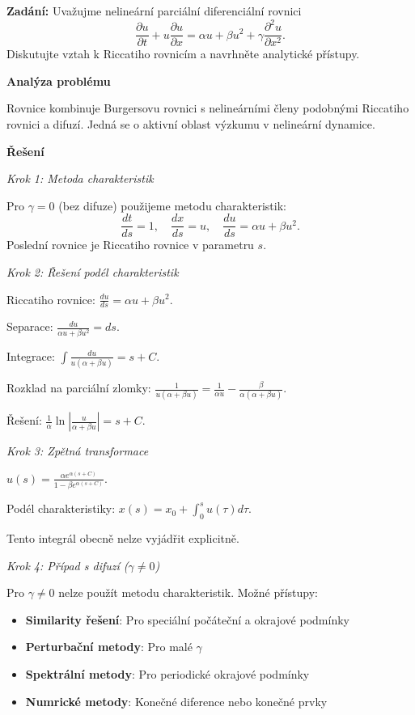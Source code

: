 \begin{example}
\label{ex:l2-riccati-e3-propojeni-pde}

\noindent\textbf{Zadání:} Uvažujme nelineární parciální diferenciální rovnici
\[
\frac{\partial u}{\partial t} + u\frac{\partial u}{\partial x} = \alpha u + \beta u^2 + \gamma\frac{\partial^2 u}{\partial x^2}.
\]
Diskutujte vztah k Riccatiho rovnicím a navrhněte analytické přístupy.

\vspace{1.5\baselineskip}

\noindent\textbf{Analýza problému}

\noindent Rovnice kombinuje Burgersovu rovnici s nelineárními členy podobnými Riccatiho rovnici a difuzí. Jedná se o aktivní oblast výzkumu v nelineární dynamice.

\vspace{1.5\baselineskip}

\noindent\textbf{Řešení}

\noindent\textit{Krok 1: Metoda charakteristik}

Pro $\gamma = 0$ (bez difuze) použijeme metodu charakteristik:
\[
\frac{dt}{ds} = 1, \quad \frac{dx}{ds} = u, \quad \frac{du}{ds} = \alpha u + \beta u^2.
\]
Poslední rovnice je Riccatiho rovnice v parametru $s$.

\noindent\textit{Krok 2: Řešení podél charakteristik}

Riccatiho rovnice: $\frac{du}{ds} = \alpha u + \beta u^2$.

Separace: $\frac{du}{\alpha u + \beta u^2} = ds$.

Integrace: $\int \frac{du}{u(\alpha + \beta u)} = s + C$.

Rozklad na parciální zlomky: $\frac{1}{u(\alpha + \beta u)} = \frac{1}{\alpha u} - \frac{\beta}{\alpha(\alpha + \beta u)}$.

Řešení: $\frac{1}{\alpha} \ln\left|\frac{u}{\alpha + \beta u}\right| = s + C$.

\noindent\textit{Krok 3: Zpětná transformace}

$u(s) = \frac{\alpha e^{\alpha(s+C)}}{1 - \beta e^{\alpha(s+C)}}$.

Podél charakteristiky: $x(s) = x_0 + \int_0^s u(\tau)d\tau$.

Tento integrál obecně nelze vyjádřit explicitně.

\noindent\textit{Krok 4: Případ s difuzí ($\gamma \neq 0$)}

Pro $\gamma \neq 0$ nelze použít metodu charakteristik. Možné přístupy:
\begin{itemize}
\item \textbf{Similarity řešení}: Pro speciální počáteční a okrajové podmínky
\item \textbf{Perturbační metody}: Pro malé $\gamma$
\item \textbf{Spektrální metody}: Pro periodické okrajové podmínky
\item \textbf{Numrické metody}: Konečné diference nebo konečné prvky
\end{itemize}


\end{example}
